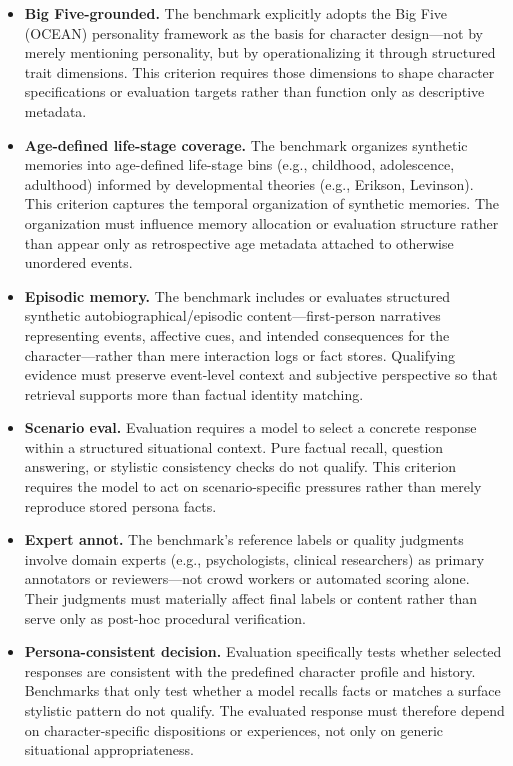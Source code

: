 \documentclass[11pt]{article}
\begin{document}
\begin{itemize}[leftmargin=1.5em, itemsep=4pt]
  \item \textbf{Big Five-grounded.} The benchmark explicitly adopts the Big Five (OCEAN) personality framework as the basis for character design---not by merely mentioning personality, but by operationalizing it through structured trait dimensions. This criterion requires those dimensions to shape character specifications or evaluation targets rather than function only as descriptive metadata.

  \item \textbf{Age-defined life-stage coverage.} The benchmark organizes synthetic memories into age-defined life-stage bins (e.g., childhood, adolescence, adulthood) informed by developmental theories (e.g., Erikson, Levinson). This criterion captures the temporal organization of synthetic memories. The organization must influence memory allocation or evaluation structure rather than appear only as retrospective age metadata attached to otherwise unordered events.

  \item \textbf{Episodic memory.} The benchmark includes or evaluates structured synthetic autobiographical/episodic content---first-person narratives representing events, affective cues, and intended consequences for the character---rather than mere interaction logs or fact stores. Qualifying evidence must preserve event-level context and subjective perspective so that retrieval supports more than factual identity matching.

  \item \textbf{Scenario eval.} Evaluation requires a model to select a concrete response within a structured situational context. Pure factual recall, question answering, or stylistic consistency checks do not qualify. This criterion requires the model to act on scenario-specific pressures rather than merely reproduce stored persona facts.

  \item \textbf{Expert annot.} The benchmark's reference labels or quality judgments involve domain experts (e.g., psychologists, clinical researchers) as primary annotators or reviewers---not crowd workers or automated scoring alone. Their judgments must materially affect final labels or content rather than serve only as post-hoc procedural verification.

  \item \textbf{Persona-consistent decision.} Evaluation specifically tests whether selected responses are consistent with the predefined character profile and history. Benchmarks that only test whether a model recalls facts or matches a surface stylistic pattern do not qualify. The evaluated response must therefore depend on character-specific dispositions or experiences, not only on generic situational appropriateness.
\end{itemize}
\end{document}
